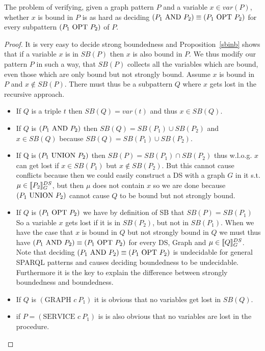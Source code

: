 \begin{theorem}\label{ezprop}
	The problem of verifying, given a graph pattern $P$ and a variable $x \in
	var(P)$, whether $x$ is bound in $P$ is as hard as deciding $(P_1 \mbox{ AND } 
	P_2)
	\equiv (P_1 \mbox{ OPT } P_2)$ for every subpattern $(P_1 \mbox{ OPT }  P_2)$ of $P$.
\end{theorem}
\begin{proof}
	It is very easy to decide strong boundedness and Proposition~\ref{sbinb}
	shows that if a variable $x$ is in $SB(P)$ then $x$ is also bound in $P$.
	We thus modify our pattern $P$ in such a way, that $SB(P)$ collects all the
	variables which are bound, even those which are only bound but not strongly
	bound.
	Assume $x$ is bound in $P$ and $x \notin SB(P)$.
	There must thus be a subpattern $Q$ where $x$ gets lost in the recursive
	approach.
	\begin{itemize}
		\item If $Q$ is a triple $t$ then $SB(Q) = var(t)$ and thus $x \in SB(Q)$.
		\item If $Q$ is $(P_1 \mbox{ AND }   P_2)$ then $SB(Q) = SB(P_1) \cup SB(P_2)$
			and $x \in SB(Q)$ because $SB(Q) = SB(P_1) \cup SB(P_2)$.
		\item If Q is $(P_1 \mbox{ UNION }  P_2)$ then $SB(P) = SB(P_1) \cap SB(P_2)$ thus
			w.l.o.g. $x$ can get lost if $x \in SB(P_1)$ but $x \notin
			SB(P_2)$. But this cannot cause conflicts because then we could
			easily construct a DS with a graph $G$ in it s.t. $\mu \in \llbracket P_2
			\rrbracket^{DS}_G$, but then $\mu$ does not contain $x$ so we are done
			because $(P_1  \mbox{ UNION }  P_2)$ cannot cause $Q$ to be bound but not
			strongly bound.
		\item If $Q$ is $(P_1 \mbox{ OPT }  P_2)$ we have by definition of SB that $SB(P) = SB(P_1)$
			So a variable $x$ gets lost if it is in $SB(P_2)$, but not in
			$SB(P_1)$. When we have the case that $x$ is bound in $Q$ but not
			strongly bound in $Q$ we must thus have $(P_1 \mbox{ AND }  P_2) \equiv
			(P_1 \mbox{ OPT }  P_2)$ for every DS, Graph and $\mu \in \llbracket Q
			\rrbracket^{DS}_G$.
			Note that deciding $(P_1 \mbox{ AND } P_2) \equiv
			(P_1 \mbox{ OPT }  P_2)$ is undecidable for general SPARQL patterns and causes deciding
			boundedness to be undecidable. Furthermore it is the key to explain
			the difference between strongly boundedness and boundedness.
		\item If $Q$ is $(\mbox{GRAPH } c \ P_1)$ it is obvious that no variables get lost
			in $SB(Q)$.
		\item if $P = (\mbox{SERVICE }  c \ P_1)$ is is also obvious that no variables are
			lost in the procedure.
	\end{itemize}
\end{proof}

